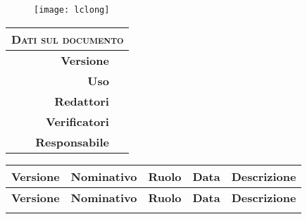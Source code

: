 \title{\huge \textsc{\phTitle{}} \\
	\vspace{11pt} \large \textsc{\phDate{}}}

\author{} %
\date{} %


\begin{figure}[t!]
	\centering
	\texttt{[image: lclong]}
\end{figure}

\maketitle
\thispagestyle{empty}

\begin{table}[ht]
	\begin{center}
		\label{tab:Dati sul documento}
		\begin{tabular}{r|l}
			\multicolumn{2}{c}{ \textsc{Dati sul documento} } \\
			\hline
			\textbf{Versione} & \versione{} \\
			\textbf{Uso} & \uso{}  \\
			\textbf{Redattori} & \redattori{} \\
			\textbf{Verificatori} & \verificatori{} \\
			\textbf{Responsabile} & \responsabile{} \\
		\end{tabular}
	\end{center}
\end{table}

\newpage

\renewcommand{\arraystretch}{2} %
\begin{longtable}[H]{>{\centering\bfseries}m{2cm} >{\centering}m{3.5cm} >{\centering}m{2.5cm} >{\centering}m{3cm} >{\centering\arraybackslash}m{5cm}}
	\rowcolor{lightgray}
	{\textbf{Versione}} & {\textbf{Nominativo}} & {\textbf{Ruolo}} & {\textbf{Data}} & {\textbf{Descrizione}}  \\
	\endfirsthead%
	\rowcolor{lightgray}
	{\textbf{Versione}} & {\textbf{Nominativo}}  & {\textbf{Ruolo}} & {\textbf{Data}} & {\textbf{Descrizione}}  \\
	\endhead%
	\modifiche{}%
\end{longtable}
